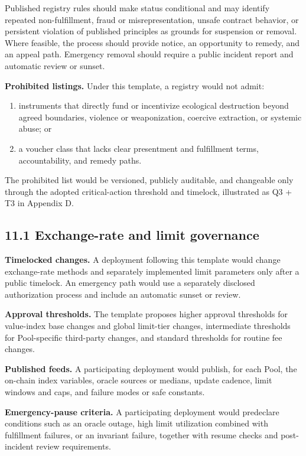 \documentclass[11pt]{article}
\begin{document}
Published registry rules should make status conditional and may identify repeated non-fulfillment, fraud or misrepresentation, unsafe contract behavior, or persistent violation of published principles as grounds for suspension or removal. Where feasible, the process should provide notice, an opportunity to remedy, and an appeal path. Emergency removal should require a public incident report and automatic review or sunset.

\textbf{Prohibited listings.} Under this template, a registry would not admit:

\begin{enumerate}[leftmargin=*]
\item instruments that directly fund or incentivize ecological destruction beyond agreed boundaries, violence or weaponization, coercive extraction, or systemic abuse; or
\item a voucher class that lacks clear presentment and fulfillment terms, accountability, and remedy paths.
\end{enumerate}
The prohibited list would be versioned, publicly auditable, and changeable only through the adopted critical-action threshold and timelock, illustrated as Q3 + T3 in Appendix D.

\subsection*{11.1 Exchange-rate and limit governance}

\textbf{Timelocked changes.} A deployment following this template would change exchange-rate methods and separately implemented limit parameters only after a public timelock. An emergency path would use a separately disclosed authorization process and include an automatic sunset or review.

\textbf{Approval thresholds.} The template proposes higher approval thresholds for value-index base changes and global limit-tier changes, intermediate thresholds for Pool-specific third-party changes, and standard thresholds for routine fee changes.

\textbf{Published feeds.} A participating deployment would publish, for each Pool, the on-chain index variables, oracle sources or medians, update cadence, limit windows and caps, and failure modes or safe constants.

\textbf{Emergency-pause criteria.} A participating deployment would predeclare conditions such as an oracle outage, high limit utilization combined with fulfillment failures, or an invariant failure, together with resume checks and post-incident review requirements.
\end{document}
